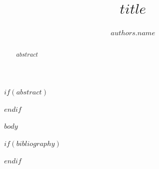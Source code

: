 \documentclass[a4paper,UKenglish,cleveref,autoref,thm-restate]{lipics-v2021}
\title{$title$}
\author{$authors.name$}{$authors.affiliation$}{$authors.email$}{$authors.orcid$}{$authors.funding$}
\theoremstyle{definition}
\begin{document}
\maketitle

$if(abstract)$
\begin{abstract}
$abstract$
\end{abstract}
$endif$

$body$

$if(bibliography)$

$endif$
\end{document}
